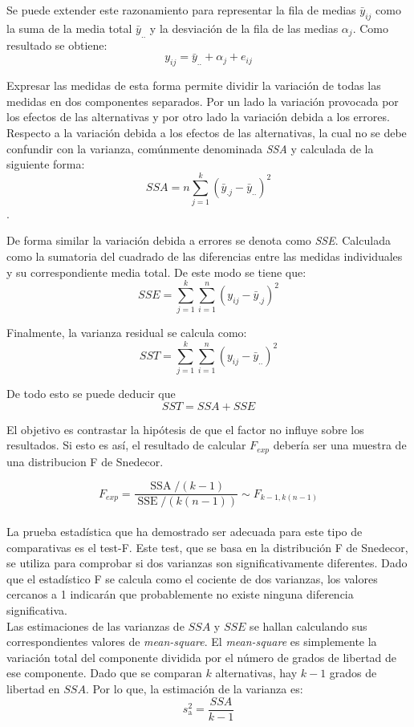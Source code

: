 Se puede extender este razonamiento para representar la fila de medias $\bar{y}_{ij}$ como la suma de la media total $\bar{y}_{..}$ y la desviación de la fila de las medias $\alpha_j$. Como resultado se obtiene: $$
y_{i j}=\bar{y}_{. .}+\alpha_{j}+e_{i j}
$$

Expresar las medidas de esta forma permite dividir la variación de todas las medidas en dos componentes separados. Por un lado la variación provocada por los efectos de las alternativas y por otro lado la variación debida a los errores. Respecto a la variación debida a los efectos de las alternativas, la cual no se debe confundir con la varianza, comúnmente denominada \textit{SSA} y  calculada de la siguiente forma:  $$S S A=n \sum_{j=1}^{k}\left(\bar{y}_{. j}-\bar{y}_{. .}\right)^{2}$$. 

De forma similar la variación debida a errores se denota como \textit{SSE}. Calculada como la sumatoria del cuadrado de las diferencias entre las medidas individuales y su correspondiente media total. De este modo se tiene que:  $$S S E=\sum_{j=1}^{k} \sum_{i=1}^{n}\left(y_{i j}-\bar{y}_{. j}\right)^{2}$$ 

Finalmente, la varianza residual se calcula como:
$$
S S T=\sum_{j=1}^{k} \sum_{i=1}^{n}\left(y_{i j}-\bar{y}_{..}\right)^{2}
$$

De todo esto se puede deducir que $$S S T= S S A + S S E$$

El objetivo es contrastar la hipótesis de que el factor no influye sobre los resultados. Si esto es así, el resultado de calcular $F_{exp}$ debería ser una muestra de una distribucion F de Snedecor.

$$
F_{e x p} = \frac{\operatorname{SSA} /\left(k-1\right)}{\operatorname{SSE} /\left (k(n-1)\right) } \sim F_{k-1,k(n-1)}
$$
\\
La prueba estadística que ha demostrado ser adecuada para este tipo de comparativas es el test-F. Este test, que se basa en la distribución F de Snedecor, se utiliza para comprobar si dos varianzas son significativamente diferentes. Dado que el estadístico F se calcula como el cociente de dos varianzas, los valores cercanos a 1 indicarán que probablemente no existe ninguna diferencia significativa.\\

Las estimaciones de las varianzas de $SSA$ y $SSE$ se hallan calculando sus correspondientes valores de \textit{mean-square}. El \textit{mean-square} es simplemente la variación total del componente dividida por el número de grados de libertad de ese componente. Dado que se comparan $k$ alternativas, hay $k-1$ grados de libertad en $SSA$. Por lo que, la estimación de la varianza es: $$
s_{\mathrm{a}}^{2}=\frac{S S A}{k-1}
$$

